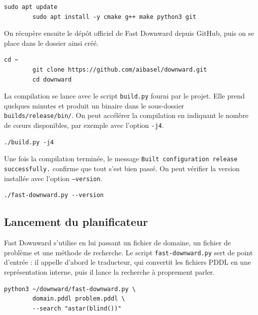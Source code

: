 \documentclass[a4paper, 11pt]{report}
\begin{document}
	\begin{lstlisting}[style=bash, caption={Installation des dépendances.}]
		sudo apt update
		sudo apt install -y cmake g++ make python3 git
	\end{lstlisting}
	
	On récupère ensuite le dépôt officiel de Fast Downward depuis GitHub, puis
	on se place dans le dossier ainsi créé.
	
	\begin{lstlisting}[style=bash, caption={Clone du dépôt Fast Downward.}]
		cd ~
		git clone https://github.com/aibasel/downward.git
		cd downward
	\end{lstlisting}
	
	La compilation se lance avec le script \texttt{build.py} fourni par le
	projet. Elle prend quelques minutes et produit un binaire dans le
	sous-dossier \texttt{builds/release/bin/}. On peut accélérer la compilation
	en indiquant le nombre de cœurs disponibles, par exemple avec l'option
	\texttt{-j4}.
	
	\begin{lstlisting}[style=bash, caption={Compilation de Fast Downward.}]
		./build.py -j4
	\end{lstlisting}
	
	Une fois la compilation terminée, le message
	\texttt{Built configuration release successfully.} confirme que tout s'est
	bien passé. On peut vérifier la version installée avec l'option
	\texttt{--version}.
	
	\begin{lstlisting}[style=bash, caption={Vérification de l'installation.}]
		./fast-downward.py --version
	\end{lstlisting}
	
	\subsection{Lancement du planificateur}
	
	Fast Downward s'utilise en lui passant un fichier de domaine, un fichier de
	problème et une méthode de recherche. Le script
	\texttt{fast-downward.py} sert de point d'entrée : il appelle d'abord le
	traducteur, qui convertit les fichiers PDDL en une représentation interne,
	puis il lance la recherche à proprement parler.
	
	\begin{lstlisting}[style=bash, caption={Lancement sur le scénario 1.}]
		python3 ~/downward/fast-downward.py \
		domain.pddl problem.pddl \
		--search "astar(blind())"
	\end{lstlisting}
	
\end{document}
